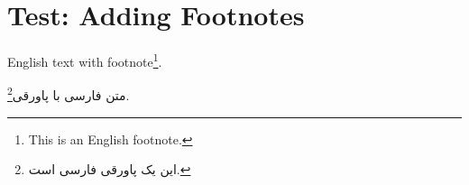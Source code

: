 \documentclass[12pt,a4paper]{article}
\newcommand{\fa}[1]{\textfarsi{#1}}
\newcommand{\en}[1]{\textenglish{#1}}
\begin{document}
\section*{Test: Adding Footnotes}

\en{English text with footnote\footnote{This is an English footnote.}.}

\fa{متن فارسی با پاورقی\footnote{\fa{این یک پاورقی فارسی است.}}.}
\end{document}
